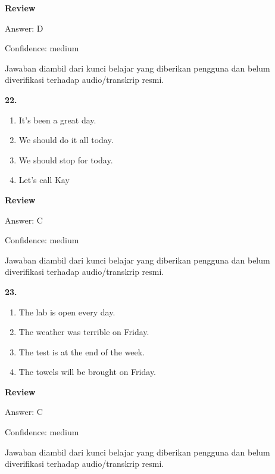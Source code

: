 \documentclass[12pt]{article}
\begin{document}
\par
\begingroup
\setlength{\parskip}{0pt}
\setlength{\parindent}{0pt}
\textbf{Review}\par
Answer: D\par
Confidence: medium\par
Jawaban diambil dari kunci belajar yang diberikan pengguna dan belum diverifikasi terhadap audio/transkrip resmi.\par
\endgroup
\par
\vspace{0.25\baselineskip}
\noindent\textbf{22.}
\begin{enumerate}[label=(\Alph*),leftmargin=*,itemsep=0.2em]
\item It's been a great day.
\item We should do it all today.
\item We should stop for today.
\item Let's call Kay
\end{enumerate}
\par
\begingroup
\setlength{\parskip}{0pt}
\setlength{\parindent}{0pt}
\textbf{Review}\par
Answer: C\par
Confidence: medium\par
Jawaban diambil dari kunci belajar yang diberikan pengguna dan belum diverifikasi terhadap audio/transkrip resmi.\par
\endgroup
\par
\vspace{0.25\baselineskip}
\noindent\textbf{23.}
\begin{enumerate}[label=(\Alph*),leftmargin=*,itemsep=0.2em]
\item The lab is open every day.
\item The weather was terrible on Friday.
\item The test is at the end of the week.
\item The towels will be brought on Friday.
\end{enumerate}
\par
\begingroup
\setlength{\parskip}{0pt}
\setlength{\parindent}{0pt}
\textbf{Review}\par
Answer: C\par
Confidence: medium\par
Jawaban diambil dari kunci belajar yang diberikan pengguna dan belum diverifikasi terhadap audio/transkrip resmi.\par
\endgroup
\par
\vspace{0.25\baselineskip}
\end{document}
